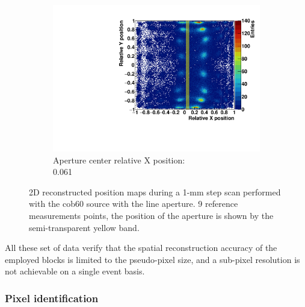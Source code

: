 \begin{figure}
\begin{subfigure}[t]{0.32\textwidth}
\centering
\includegraphics[width=\textwidth]{03_GraphicFiles/chapter3_CLaRySproto/Absorber/images_scan/line_1mm/run00022_floodMap.pdf}
\caption{Aperture center relative X position: \\ 0.061}
\label{chap3::fig::scan_map9_1mm}
\end{subfigure}
\caption{2D reconstructed position maps during a 1-mm step scan performed with the \gls{cob60} source with the line aperture. 9 reference measurements points, the position of the aperture is shown by the semi-transparent yellow band.}
\label{chap3::fig::ScanFloodMap_1mm}
\end{figure}

All these set of data verify that the spatial reconstruction accuracy of the employed blocks is limited to the pseudo-pixel size, and a sub-pixel resolution is not achievable on a single event basis. 


\subsubsection{Pixel identification}\label{chap3::subsubsec::absPixelID}

